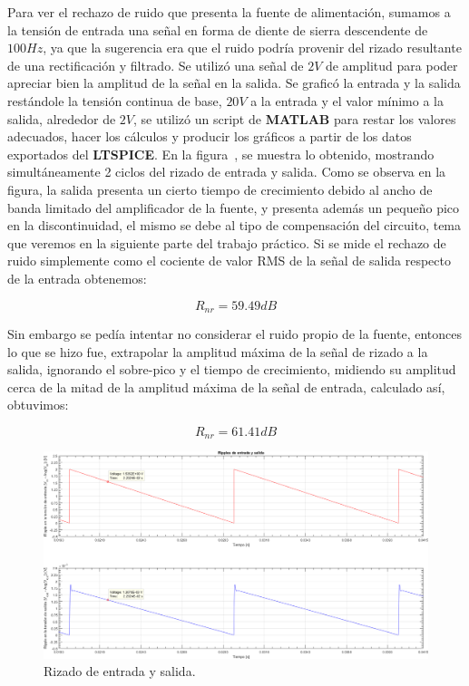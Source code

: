 \vspace{1.5cm}


Para ver el rechazo de ruido que presenta la fuente de alimentación, sumamos a la tensión de entrada una señal en forma de diente de sierra descendente de $100 Hz$, ya que la sugerencia era que el ruido podría provenir del rizado resultante de una rectificación y filtrado. Se utilizó una señal de $2 V$ de amplitud para poder apreciar bien la amplitud de la señal en la salida. Se graficó la entrada y la salida restándole la tensión continua de base, $20 V$ a la entrada y el valor mínimo a la salida, alrededor de $2 V$, se utilizó un script de \textbf{MATLAB} para restar los valores adecuados, hacer los cálculos y producir los gráficos a partir de los datos exportados del \textbf{LTSPICE}. En la figura~, se muestra lo obtenido, mostrando simultáneamente 2 ciclos del rizado de entrada y salida.
Como se observa en la figura, la salida presenta un cierto tiempo de crecimiento debido al ancho de banda limitado del amplificador de la fuente, y presenta además un pequeño pico en la discontinuidad, el mismo se debe al tipo de compensación del circuito, tema que veremos en la siguiente parte del trabajo práctico. Si se mide el rechazo de ruido simplemente como el cociente de valor RMS de la señal de salida respecto de la entrada obtenemos:


\begin{equation}
    R_{nr}= 59.49 dB
\end{equation}

Sin embargo se pedía intentar no considerar el ruido propio de la fuente, entonces lo que se hizo fue, extrapolar la amplitud máxima de la señal de rizado a la salida, ignorando el sobre-pico y el tiempo de crecimiento, midiendo su amplitud cerca de la mitad de la amplitud máxima de la señal de entrada, calculado así, obtuvimos:


\begin{equation}
    R_{nr}= 61.41 dB
\end{equation}

\vfill

\clearpage

\begin{figure}[H] %
\begin{center}
\includegraphics[width=1.2 \textwidth, angle=90]{./img/preguntas/p20.png}
\caption{\label{fig:fig_p20_ripple}\footnotesize{Rizado de entrada y salida.}}
\end{center}
\end{figure}

\clearpage
